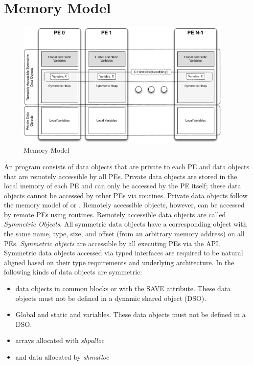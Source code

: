 \section{Memory Model}
\begin{figure}[h]
\includegraphics[width=0.95\textwidth]{diagrams/updated/mem_model}      
\caption{\OSH{} Memory Model}                                   
\label{fig:mem_model}                                               
\end{figure}      
An \openshmem program consists of data objects that are private to each \ac{PE} and data 
objects that are remotely accessible by all \ac{PE}s. Private data objects are stored in the local
memory of each \ac{PE} and can only be accessed by the \ac{PE} itself; these data objects
cannot be accessed by other \ac{PE}s via \openshmem routines. Private data objects
follow the memory model of \Clang{} or \Fortran{}. Remotely accessible
objects, however, can be accessed by remote \ac{PE}s using \openshmem routines.
Remotely accessible data objects are called \emph{Symmetric Objects}.
All symmetric data objects have a corresponding object with the same
name, type, size, and offset (from an arbitrary memory address) on all \ac{PE}s. \emph{Symmetric objects } are accessible by all executing \ac{PE}s via the \openshmem \ac{API}. 
Symmetric data objects accessed via typed \openshmem interfaces are required to be natural aligned based on their type requirements and underlying architecture.
In \openshmem{} the following kinds of data objects are symmetric:
\begin{itemize}
  \item \Fortran{} data objects in common blocks or with the  SAVE  attribute. These data objects must not be defined in a dynamic shared object (DSO).
  \item Global and static \Clang{} and \Cpp{} variables. These data objects must  not  be defined in a DSO.
  \item \Fortran{} arrays allocated with \textit{shpalloc} 
  \item \Clang{} and \Cpp{} data allocated by \textit{shmalloc}
\end{itemize}       

